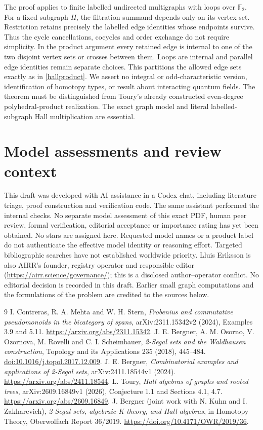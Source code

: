 \documentclass[11pt,a4paper]{article}
\newcommand{\F}{\mathbb F_2}
\begin{document}
The proof applies to finite labelled undirected multigraphs with loops over $\F$.
For a fixed subgraph $H$, the filtration summand depends only on its vertex set.
Restriction retains precisely the labelled edge identities whose endpoints
survive. Thus the cycle cancellations, cocycles and order exchange do not
require simplicity. In the product argument every retained edge is internal
to one of the two disjoint vertex sets or crosses between them. Loops are
internal and parallel edge identities remain separate choices. This partitions
the allowed edge sets exactly as in \eqref{hallproduct}.
We assert no integral or odd-characteristic version, identification of
homotopy types, or result about interacting quantum fields. The theorem
must be distinguished from Toury's already constructed even-degree
polyhedral-product realization. The exact graph model and literal
labelled-subgraph Hall multiplication are essential.

\section{Model assessments and review context}
This draft was developed with AI assistance in a Codex chat, including
literature triage, proof construction and verification code. The same
assistant performed the internal checks. No separate model assessment of
this exact PDF, human peer review, formal verification, editorial acceptance
or importance rating has yet been obtained. No stars are assigned here.
Requested model names or a product label do not authenticate the effective
model identity or reasoning effort. Targeted bibliographic searches have
not established worldwide priority. Lluis Eriksson is also AIRR's founder, registry operator and responsible
editor (\url{https://airr.science/governance/}); this is a disclosed
author--operator conflict. No editorial decision is recorded in this draft.
Earlier small graph computations and
the formulations of the problem are credited to the sources below.

\begin{thebibliography}{9}
 I. Contreras, R. A. Mehta and W. H. Stern,
\emph{Frobenius and commutative pseudomonoids in the bicategory of spans},
arXiv:2311.15342v2 (2024), Examples 3.9 and 5.11.
\url{https://arxiv.org/abs/2311.15342}.
 J. E. Bergner, A. M. Osorno, V. Ozornova, M. Rovelli and
C. I. Scheimbauer, \emph{2-Segal sets and the Waldhausen construction},
Topology and its Applications 235 (2018), 445--484.
\href{https://doi.org/10.1016/j.topol.2017.12.009}{doi:10.1016/j.topol.2017.12.009}.
 J. E. Bergner, \emph{Combinatorial examples and applications
of 2-Segal sets}, arXiv:2411.18544v1 (2024).
\url{https://arxiv.org/abs/2411.18544}.
 L. Toury, \emph{Hall algebras of graphs and rooted trees},
arXiv:2609.16849v1 (2026), Conjecture 1.1 and Sections 4.1, 4.7.
\url{https://arxiv.org/abs/2609.16849}.
 J. Bergner (joint work with N. Kuhn and I. Zakharevich),
\emph{2-Segal sets, algebraic K-theory, and Hall algebras}, in
Homotopy Theory, Oberwolfach Report 36/2019.
\url{https://doi.org/10.4171/OWR/2019/36}.
\end{thebibliography}
\end{document}
